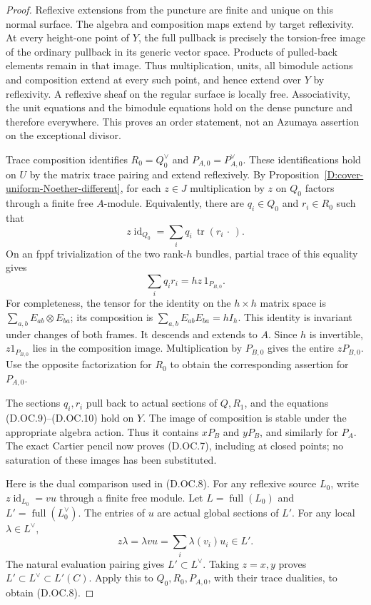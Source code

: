 \begin{proof}
Reflexive extensions from the puncture are finite and unique
on this normal surface. The algebra and composition maps
extend by target reflexivity. At every height-one point of
$Y$, the full pullback is precisely the torsion-free image
of the ordinary pullback in its generic vector space.
Products of pulled-back elements remain in that image.
Thus multiplication, units, all bimodule actions and
composition extend at every such point, and hence extend
over $Y$ by reflexivity. A reflexive sheaf on the regular
surface is locally free. Associativity, the unit equations
and the bimodule equations hold on the dense puncture and
therefore everywhere. This proves an order statement, not
an Azumaya assertion on the exceptional divisor.

Trace composition identifies $R_0=Q_0^\vee$ and
$P_{A,0}=P_{A,0}^\vee$. These identifications hold on $U$
by the matrix trace pairing and extend reflexively.
By Proposition~\ref{D:cover-uniform-Noether-different},
for each $z\in J$ multiplication by $z$ on $Q_0$ factors
through a finite free $A$-module. Equivalently, there are
$q_i\in Q_0$ and $r_i\in R_0$ such that
\[
 z\operatorname{id}_{Q_0}
       =\sum_i q_i\,\operatorname{tr}(r_i\,\cdot\,).
                                                        \tag{D.OC.9}
\]
On an fppf trivialization of the two rank-$h$ bundles,
partial trace of this equality gives
\[
                  \sum_i q_i r_i=hz\,1_{P_{B,0}}.
                                                        \tag{D.OC.10}
\]
For completeness, the tensor for the identity on the
$h\times h$ matrix space is
$\sum_{a,b}E_{ab}\otimes E_{ba}$; its composition is
$\sum_{a,b}E_{ab}E_{ba}=hI_h$.
This identity is invariant under changes of both frames.
It descends and extends to $A$. Since $h$ is invertible,
$z1_{P_{B,0}}$ lies in the composition image. Multiplication
by $P_{B,0}$ gives the entire $zP_{B,0}$.
Use the opposite factorization for $R_0$ to obtain the
corresponding assertion for $P_{A,0}$.

The sections $q_i,r_i$ pull back to actual sections of
$Q,R_1$, and the equations (D.OC.9)--(D.OC.10) hold on $Y$.
The image of composition is stable under the appropriate
algebra action. Thus it contains $xP_B$ and $yP_B$, and
similarly for $P_A$. The exact Cartier pencil now proves
(D.OC.7), including at closed points; no saturation of
these images has been substituted.

Here is the dual comparison used in (D.OC.8).
For any reflexive source $L_0$, write
$z\operatorname{id}_{L_0}=vu$ through a finite free module.
Let $L=\operatorname{full}(L_0)$ and
$L'=\operatorname{full}(L_0^\vee)$.
The entries of $u$ are actual global sections of $L'$.
For any local $\lambda\in L^\vee$,
\[
 z\lambda=\lambda vu
   =\sum_i\lambda(v_i)u_i\in L'.                      \tag{D.OC.11}
\]
The natural evaluation pairing gives $L'\subset L^\vee$.
Taking $z=x,y$ proves
$L'\subset L^\vee\subset L'(C)$.
Apply this to $Q_0,R_0,P_{A,0}$, with their trace dualities,
to obtain (D.OC.8).


\end{proof}
